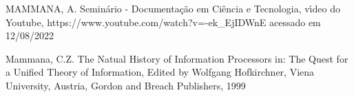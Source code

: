 \documentclass[
12pt,		%
openright,	%
twoside,  %
a4paper,			%
chapter=TITLE,		%
english,			%
french,				%
spanish,			%
brazil				%
]{USPSC-classe/USPSC}
\begin{document}
\begin{flushleft}
\begin{flushleft}
\begin{flushleft}
\begin{flushleft}
\begin{flushleft}
\begin{flushleft}
\begin{flushleft}
\begin{flushleft}
\begin{flushleft}
[MAMMANA, 2020] MAMMANA, A. Semin\'ario - Documenta\c{c}\~ao em Ci\^encia e Tecnologia, v\'{\i}deo do Youtube, https://www.youtube.com/watch?v=-ek\_EjIDWnE acessado em 12/08/2022
\end{flushleft}


\end{flushleft}


\end{flushleft}


\end{flushleft}


\end{flushleft}


\end{flushleft}


\end{flushleft}


\end{flushleft}


\end{flushleft}


\begin{flushleft}
\begin{flushleft}
\begin{flushleft}
\begin{flushleft}
\begin{flushleft}
\begin{flushleft}
\begin{flushleft}
\begin{flushleft}
\begin{flushleft}
[MAMMANA, 1999] Mammana, C.Z. The Natual History of Information Processors in: The Quest for a Unified Theory of Information, Edited by Wolfgang Hofkirchner, Viena University, Austria, Gordon and Breach Publishers, 1999
\end{flushleft}


\end{flushleft}


\end{flushleft}


\end{flushleft}


\end{flushleft}


\end{flushleft}


\end{flushleft}


\end{flushleft}


\end{flushleft}
\end{document}
